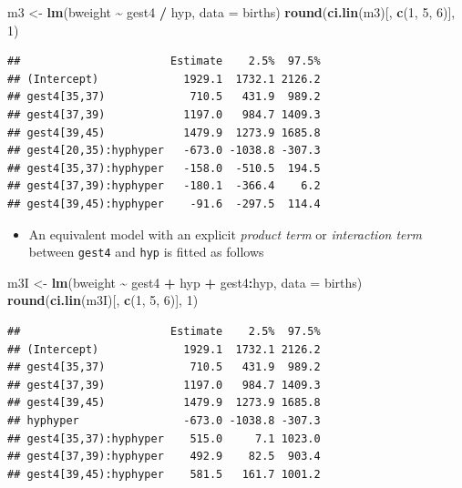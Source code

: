 \documentclass[
]{book}
\newenvironment{Shaded}{\begin{snugshade}}{\end{snugshade}}
\newcommand{\AttributeTok}[1]{\textcolor[rgb]{0.13,0.29,0.53}{#1}}
\newcommand{\DecValTok}[1]{\textcolor[rgb]{0.00,0.00,0.81}{#1}}
\newcommand{\FunctionTok}[1]{\textcolor[rgb]{0.13,0.29,0.53}{\textbf{#1}}}
\newcommand{\NormalTok}[1]{#1}
\newcommand{\OtherTok}[1]{\textcolor[rgb]{0.56,0.35,0.01}{#1}}
\newcommand{\SpecialCharTok}[1]{\textcolor[rgb]{0.81,0.36,0.00}{\textbf{#1}}}
\providecommand{\tightlist}{%
  \setlength{\itemsep}{0pt}\setlength{\parskip}{0pt}}
\begin{document}
\begin{Shaded}
\begin{Highlighting}[]
\NormalTok{m3 }\OtherTok{\textless{}{-}} \FunctionTok{lm}\NormalTok{(bweight }\SpecialCharTok{\textasciitilde{}}\NormalTok{ gest4 }\SpecialCharTok{/}\NormalTok{ hyp, }\AttributeTok{data =}\NormalTok{ births)}
\FunctionTok{round}\NormalTok{(}\FunctionTok{ci.lin}\NormalTok{(m3)[, }\FunctionTok{c}\NormalTok{(}\DecValTok{1}\NormalTok{, }\DecValTok{5}\NormalTok{, }\DecValTok{6}\NormalTok{)], }\DecValTok{1}\NormalTok{)}
\end{Highlighting}
\end{Shaded}

\begin{verbatim}
##                       Estimate    2.5%  97.5%
## (Intercept)             1929.1  1732.1 2126.2
## gest4[35,37)             710.5   431.9  989.2
## gest4[37,39)            1197.0   984.7 1409.3
## gest4[39,45)            1479.9  1273.9 1685.8
## gest4[20,35):hyphyper   -673.0 -1038.8 -307.3
## gest4[35,37):hyphyper   -158.0  -510.5  194.5
## gest4[37,39):hyphyper   -180.1  -366.4    6.2
## gest4[39,45):hyphyper    -91.6  -297.5  114.4
\end{verbatim}

\begin{itemize}
\tightlist
\item
  An equivalent model with an explicit \emph{product term} or
  \emph{interaction term} between \texttt{gest4} and \texttt{hyp} is
  fitted as follows
\end{itemize}

\begin{Shaded}
\begin{Highlighting}[]
\NormalTok{m3I }\OtherTok{\textless{}{-}} \FunctionTok{lm}\NormalTok{(bweight }\SpecialCharTok{\textasciitilde{}}\NormalTok{ gest4 }\SpecialCharTok{+}\NormalTok{ hyp }\SpecialCharTok{+}\NormalTok{ gest4}\SpecialCharTok{:}\NormalTok{hyp, }\AttributeTok{data =}\NormalTok{ births)}
\FunctionTok{round}\NormalTok{(}\FunctionTok{ci.lin}\NormalTok{(m3I)[, }\FunctionTok{c}\NormalTok{(}\DecValTok{1}\NormalTok{, }\DecValTok{5}\NormalTok{, }\DecValTok{6}\NormalTok{)], }\DecValTok{1}\NormalTok{)}
\end{Highlighting}
\end{Shaded}

\begin{verbatim}
##                       Estimate    2.5%  97.5%
## (Intercept)             1929.1  1732.1 2126.2
## gest4[35,37)             710.5   431.9  989.2
## gest4[37,39)            1197.0   984.7 1409.3
## gest4[39,45)            1479.9  1273.9 1685.8
## hyphyper                -673.0 -1038.8 -307.3
## gest4[35,37):hyphyper    515.0     7.1 1023.0
## gest4[37,39):hyphyper    492.9    82.5  903.4
## gest4[39,45):hyphyper    581.5   161.7 1001.2
\end{verbatim}
\end{document}
